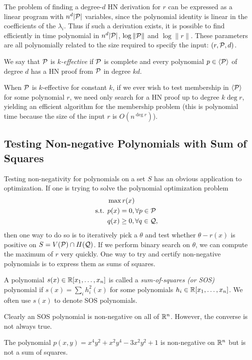 The problem of finding a degree-$d$ HN derivation for $r$ can be expressed as a linear program with $n^d|\mathcal P|$ variables, since the polynomial identity is linear in the coefficients of the $\lambda_i$. Thus if such a derivation exists, it is possible to find efficiently in time polynomial in $n^d|\mathcal P|$, $\log \|\mathcal P\|$ and $\log \|r\|$. These parameters are all polynomially related to the size required to specify the input: $(r,\mathcal P,d)$.
\begin{definition}
We say that $\mathcal P$ is \emph{$k$-effective} if $\mathcal P$ is complete and every polynomial $p \in \langle \mathcal P \rangle$ of degree $d$ has a HN proof from $\mathcal P$ in degree $kd$.
\end{definition}
When $\mathcal P$ is $k$-effective for constant $k$, if we ever wish to test membership in $\langle \mathcal P \rangle$ for some polynomial $r$, we need only search for a HN proof up to degree $k \deg r$, yielding an efficient algorithm for the membership problem (this is polynomial time because the size of the input $r$ is $O(n^{\deg r})$).

\subsection{Testing Non-negative Polynomials with Sum of Squares}

Testing non-negativity for polynomials on a set $S$ has an obvious application to optimization. If one is trying to solve the polynomial optimization problem
\begin{align*}
&\max r(x) \\
\text{s.t. } &p(x) = 0, \forall p \in \mathcal P \\
&q(x) \geq 0, \forall q \in \mathcal Q,
\end{align*}
then one way to do so is to iteratively pick a $\theta$ and test whether $\theta - r(x)$ is positive on $S = V(\mathcal P) \cap H(\mathcal Q)$.
If we perform binary search on $\theta$, we can compute the maximum of $r$ very quickly. One way to try and certify non-negative polynomials is to express them as sums of squares.

\begin{definition}
A polynomial $s(x) \in \mathbb R[x_1,\dots,x_n]$ is called a \emph{sum-of-squares (or SOS)} polynomial if $s(x) = \sum_i h_i^2(x)$ for some polynomials $h_i \in \mathbb R[x_1,\dots,x_n]$. We often use $s(x)$ to denote SOS polynomials.
\end{definition}

Clearly an SOS polynomial is non-negative on all of $\mathbb R^n$. However, the converse is not always true.
\begin{fact}
The polynomial $p(x,y) = x^4y^2 + x^2y^4 - 3x^2y^2 + 1$ is non-negative on $\mathbb R^n$ but is not a sum of squares.
\end{fact}

